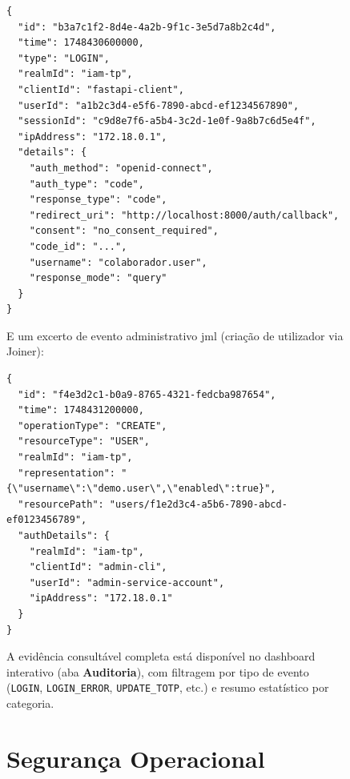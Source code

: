 \begin{figure}[h!]
\begin{table}[h!]
\begin{lstlisting}[caption={Excerto de evento de auditoria — login bem-sucedido},label={lst:audit_evento}]
{
  "id": "b3a7c1f2-8d4e-4a2b-9f1c-3e5d7a8b2c4d",
  "time": 1748430600000,
  "type": "LOGIN",
  "realmId": "iam-tp",
  "clientId": "fastapi-client",
  "userId": "a1b2c3d4-e5f6-7890-abcd-ef1234567890",
  "sessionId": "c9d8e7f6-a5b4-3c2d-1e0f-9a8b7c6d5e4f",
  "ipAddress": "172.18.0.1",
  "details": {
    "auth_method": "openid-connect",
    "auth_type": "code",
    "response_type": "code",
    "redirect_uri": "http://localhost:8000/auth/callback",
    "consent": "no_consent_required",
    "code_id": "...",
    "username": "colaborador.user",
    "response_mode": "query"
  }
}
\end{lstlisting}

E um excerto de evento administrativo \gls{jml} (criação de utilizador via Joiner):

\begin{lstlisting}[caption={Excerto de evento de administração — criação de utilizador (Joiner)},label={lst:audit_admin}]
{
  "id": "f4e3d2c1-b0a9-8765-4321-fedcba987654",
  "time": 1748431200000,
  "operationType": "CREATE",
  "resourceType": "USER",
  "realmId": "iam-tp",
  "representation": "{\"username\":\"demo.user\",\"enabled\":true}",
  "resourcePath": "users/f1e2d3c4-a5b6-7890-abcd-ef0123456789",
  "authDetails": {
    "realmId": "iam-tp",
    "clientId": "admin-cli",
    "userId": "admin-service-account",
    "ipAddress": "172.18.0.1"
  }
}
\end{lstlisting}

A evidência consultável completa está disponível no dashboard interativo (aba \textbf{Auditoria}), com filtragem por tipo de evento (\texttt{LOGIN}, \texttt{LOGIN\_ERROR}, \texttt{UPDATE\_TOTP}, etc.) e resumo estatístico por categoria.

\section{Segurança Operacional}


\end{table}
\end{figure}
